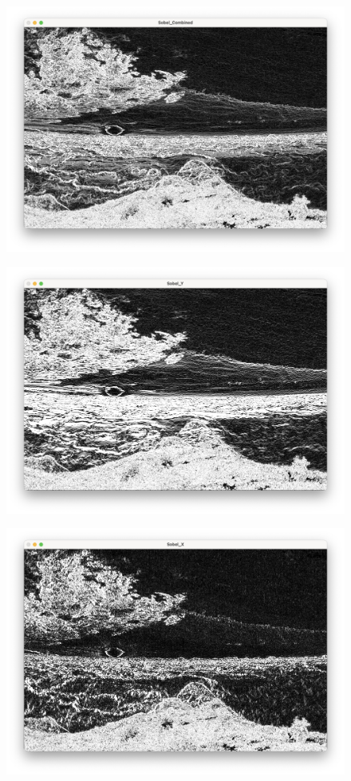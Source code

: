 \documentclass[a4paper, 12pt]{report}
\begin{document}
\begin{figure}
\includegraphics[scale=.39]{3.png}
\centering
\end{figure}
\begin{figure}
\includegraphics[scale=.39]{4.png}
\centering
\end{figure}
\begin{figure}
\includegraphics[scale=.39]{5.png}
\centering
\end{figure}
\end{document}
